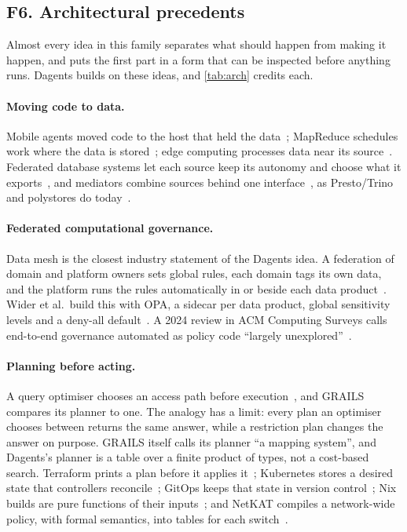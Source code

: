 \subsection{F6. Architectural precedents}
\label{sec:survey-arch}

Almost every idea in this family separates what should happen from making it
happen, and puts the first part in a form that can be inspected before anything
runs. Dagents builds on these ideas, and \cref{tab:arch} credits each.

\paragraph{Moving code to data.} Mobile agents moved code to the host that held
the data~\citep{chess1997mobile,lange1999seven}; MapReduce schedules work where
the data is stored~\citep{dean2008mapreduce}; edge computing processes data near
its source~\citep{shi2016edge}. Federated database systems let each source keep
its autonomy and choose what it exports~\citep{sheth1990federated}, and
mediators combine sources behind one interface~\citep{wiederhold1992mediators},
as Presto/Trino and polystores do today~\citep{sethi2019presto,duggan2015bigdawg}.

\paragraph{Federated computational governance.} Data mesh is the closest
industry statement of the Dagents idea. A federation of domain and platform
owners sets global rules, each domain tags its own data, and the platform runs
the rules automatically in or beside each data
product~\citep{dehghani2019monolithic,dehghani2020principles,dehghani2022datamesh,machado2022datamesh}.
Wider et al.\ build this with OPA, a sidecar per data product, global
sensitivity levels and a deny-all default~\citep{wider2023decentralized}. A
2024 review in ACM Computing Surveys calls end-to-end governance automated as
policy code ``largely unexplored''~\citep{goedegebuure2024datamesh}.

\paragraph{Planning before acting.} A query optimiser chooses an access path
before execution~\citep{selinger1979access}, and GRAILS compares its planner to
one. The analogy has a limit: every plan an optimiser chooses between returns
the same answer, while a restriction plan changes the answer on purpose. GRAILS
itself calls its planner ``a mapping system'', and Dagents's planner is a table
over a finite product of types, not a cost-based search. Terraform prints a
plan before it applies it~\citep{hashicorp_terraform_plan}; Kubernetes stores a
desired state that controllers reconcile~\citep{burns2016borg,kubernetes_controllers};
GitOps keeps that state in version control~\citep{opengitops_principles}; Nix
builds are pure functions of their inputs~\citep{dolstra2004nix,dolstra2006purely};
and NetKAT compiles a network-wide policy, with formal semantics, into tables
for each switch~\citep{foster2011frenetic,anderson2014netkat}.

